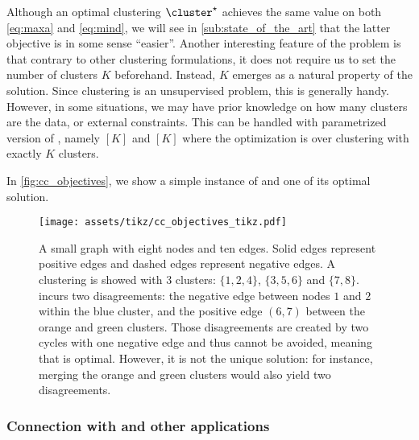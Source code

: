 Although an optimal clustering $\cluster^\star$ achieves the same value on both \eqref{eq:maxa}
and \eqref{eq:mind}, we will see in \autoref{sub:state_of_the_art} that the latter objective is in
some sense \enquote{easier}. Another interesting feature of the \pcc{} problem is that contrary to
other clustering formulations, it does not require us to set the number of clusters $K$ beforehand.
Instead, $K$ emerges as a natural property of the solution. Since clustering is an unsupervised
problem, this is generally handy. However, in some situations, we may have prior knowledge on how
many clusters are the data, or external constraints. This can be handled with parametrized version
of \pcc{}, namely \maxa$[K]$ and \mind$[K]$ where the optimization is over clustering with exactly
$K$ clusters.

In \autoref{fig:cc_objectives}, we show a simple instance of \pcc{} and one of its optimal solution.
\begin{figure}[hbt]
	\centering
	\texttt{[image: assets/tikz/cc\_objectives\_tikz.pdf]}
	\caption[Small example of \pcc{}]{A small graph with eight nodes and ten edges. Solid edges
	represent positive edges and dashed edges represent negative edges. A clustering \cluster{}
	is showed with 3 clusters: $\{1, 2, 4\}$, $\{3, 5, 6\}$ and $\{7, 8\}$. \cluster{} incurs two
	disagreements: the negative edge between nodes $1$ and $2$ within the blue cluster, and the
	positive edge $(6,7)$ between the orange and green clusters. Those disagreements are created
	by two cycles with one negative edge and thus cannot be avoided, meaning that \cluster{} is
	optimal. However, it is not the unique solution: for instance, merging the orange and green
	clusters would also yield two disagreements.}
	\label{fig:cc_objectives}
\end{figure}

\subsubsection{Connection with \esp{} and other applications}
\label{ssub:cc_applications}

